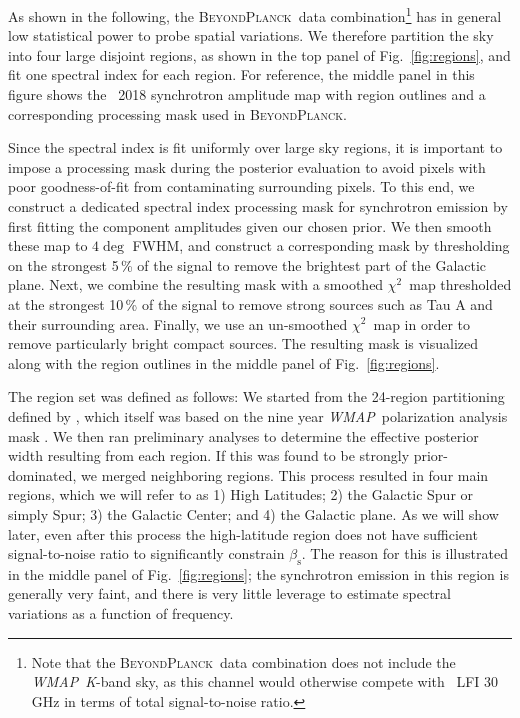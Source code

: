 \documentclass[twocolumn]{aa}
\def\WMAP{\textit{WMAP}}
\def\chisq{$\chi^2$}
\newcommand{\BP}{\textsc{BeyondPlanck}}
\newcommand{\?}[1]{\textcolor{red}{{\bf [#1]}}}
\begin{document}
As shown in the following, the \BP\ data combination\footnote{Note that the \BP\
data combination does not include the \WMAP\ \textit K-band sky, as this channel would
otherwise compete with \Planck\ LFI 30\,GHz in terms of total signal-to-noise
ratio.} has in general low statistical power to probe spatial variations. We
therefore partition the sky into four large disjoint regions, as shown in the
top panel of Fig.~\ref{fig:regions}, and fit one spectral index for each
region. For reference, the middle panel in this figure shows the \Planck\ 2018
synchrotron amplitude map \citep{planck2016-l04} with region outlines and a
corresponding processing mask used in \BP. 

Since the spectral index is fit uniformly over large sky regions, it is
important to impose a processing mask during the posterior evaluation to avoid
pixels with poor goodness-of-fit from contaminating surrounding pixels. To this
end, we construct a dedicated spectral index processing mask for synchrotron
emission by first fitting the component amplitudes given our chosen prior. We
then smooth these map to $4\deg$ FWHM, and construct a corresponding mask by
thresholding on the strongest 5\,\% of the signal to remove the brightest part
of the Galactic plane. Next, we combine the resulting mask with a smoothed
\chisq\ map thresholded at the strongest 10\,\% of the signal to remove strong
sources such as Tau A and their surrounding area.  Finally, we use an
un-smoothed \chisq\ map in order to remove particularly bright compact sources.
The resulting mask is visualized along with the region outlines in the middle
panel of Fig.~\ref{fig:regions}.

The region set was defined as follows: We started from the 24-region
partitioning defined by \citet{fuskeland2014}, which itself was based
on the nine year \WMAP\ polarization analysis mask
\citep{bennett2012}. We then ran preliminary analyses to determine the
effective posterior width resulting from each region. If this was
found to be strongly prior-dominated, we merged neighboring
regions. This process resulted in four main regions, which we will
refer to as 1) High Latitudes; 2) the Galactic Spur or simply Spur; 3)
the Galactic Center; and 4) the Galactic plane. As we will show later,
even after this process the high-latitude region does not have
sufficient signal-to-noise ratio to significantly constrain
$\beta_{\mathrm s}$. The reason for this is illustrated in the middle
panel of Fig.~\ref{fig:regions}; the synchrotron emission in this
region is generally very faint, and there is very little leverage to
estimate spectral variations as a function of frequency.
\end{document}

